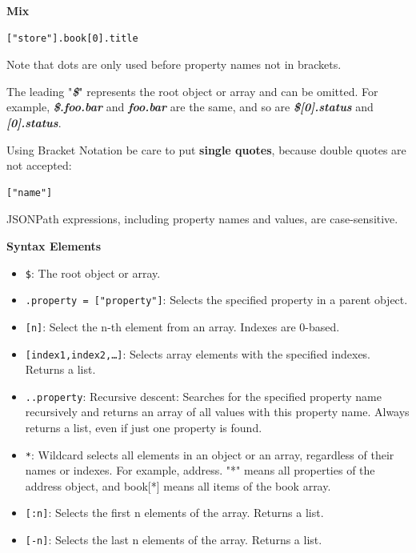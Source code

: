 \documentclass{article}
\newenvironment{blocktemplate}[1]{%
    \tcolorbox[beamer,%
    noparskip,breakable,
    colframe=Blue,%
    colbacklower=LimeGreen!75!LightGreen,%
    title=#1]}%
    {\endtcolorbox}
\newenvironment{blocktemplateII}[1]{%
    \tcolorbox[beamer,%
    noparskip,breakable,
    colframe=Green,%
    colbacklower=LimeGreen!75!LightGreen,%
    title=#1]}%
    {\endtcolorbox}
\newenvironment{blocktemplateIII}[1]{%
    \tcolorbox[beamer,%
    noparskip,breakable,
    ,colframe=Red,%
    colbacklower=LimeGreen!75!LightGreen,%
    title=#1]}%
    {\endtcolorbox}
\newenvironment{codetemplate}[1][]{%
  \mybasecolorbox[#1]
  \itshape
}{%
  \endmybasecolorbox
}
\begin{document}
\textbf{Mix}
\begin{codetemplate}{}
\begin{verbatim}
["store"].book[0].title
\end{verbatim}
\end{codetemplate}

\begin{blocktemplate}{Nota}
Note that dots are only used before property names not in brackets.
\end{blocktemplate}

\begin{blocktemplateII}{Nota 2}
The leading "\textbf{\textit{\$}}" represents the root object or array and can be omitted. For example, \textbf{\textit{\$.foo.bar}} and \textbf{\textit{foo.bar}} are the same, and so are \textbf{\textit{\$[0].status}} and \textbf{\textit{[0].status}}.
\end{blocktemplateII}

\begin{blocktemplateIII}{Nota 3}
Using Bracket Notation be care to put \textbf{single quotes}, because double quotes are not accepted:
\begin{verbatim}
["name"]
\end{verbatim}
\end{blocktemplateIII}

\begin{blocktemplateIII}{Nota 4}
JSONPath expressions, including property names and values, are case-sensitive.
\end{blocktemplateIII}

\textbf{Syntax Elements}
\begin{itemize}
    \item \verb|$|: The root object or array.
    \item \verb|.property = ["property"]|: Selects the specified property in a parent object.
    \item \verb|[n]|: Select the n-th element from an array. Indexes are 0-based.
    \item \verb|[index1,index2,…]|: Selects array elements with the specified indexes. Returns a list.
    \item \verb|..property|: Recursive descent: Searches for the specified property name recursively and returns an array of all values with this property name. Always returns a list, even if just one property is found.
    \item \verb|*|: Wildcard selects all elements in an object or an array, regardless of their names or indexes. For example, address. "*" means all properties of the address object, and book[*] means all items of the book array.
    \item \verb|[:n]|: Selects the first n elements of the array. Returns a list.
    \item \verb|[-n]|: Selects the last n elements of the array. Returns a list.
\end{itemize}
\end{document}
